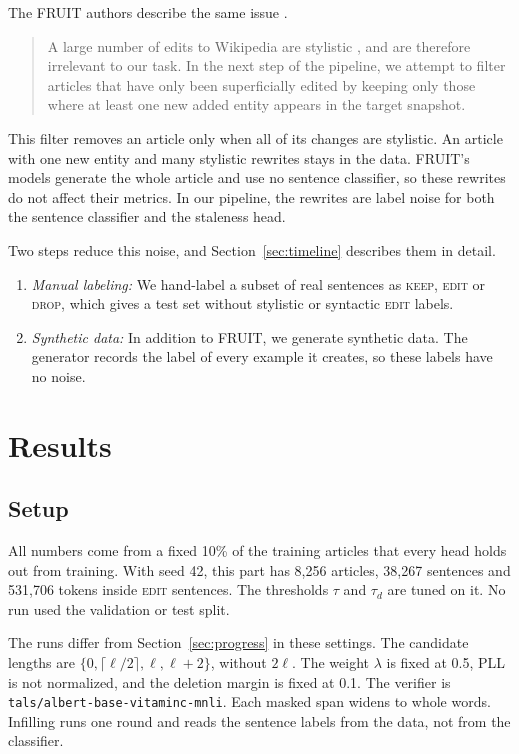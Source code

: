 \documentclass[11pt]{article}
\newcommand{\keep}{\textsc{keep}}
\newcommand{\edit}{\textsc{edit}}
\newcommand{\drop}{\textsc{drop}}
\begin{document}
    The FRUIT authors describe the same issue \citep{iv-etal-2022-fruit}.
    \begin{quote}
    A large number of edits to Wikipedia are stylistic \citep{daxenberger-gurevych-2012-corpus}, and are therefore irrelevant to our task. In the next step of the pipeline, we attempt to filter articles that have only been superficially edited by keeping only those where at least one new added entity appears in the target snapshot.
    \end{quote}

    This filter removes an article only when all of its changes are stylistic. An article with one new entity and many stylistic rewrites stays in the data. FRUIT's models generate the whole article and use no sentence classifier, so these rewrites do not affect their metrics. In our pipeline, the rewrites are label noise for both the sentence classifier and the staleness head.

    Two steps reduce this noise, and Section~\ref{sec:timeline} describes them in detail.
    \begin{enumerate}
        \item \emph{Manual labeling:} We hand-label a subset of real sentences as \keep{}, \edit{} or \drop{}, which gives a test set without stylistic or syntactic \edit{} labels.
        \item \emph{Synthetic data:} In addition to FRUIT, we generate synthetic data. The generator records the label of every example it creates, so these labels have no noise.
    \end{enumerate}

\section{Results}
\label{sec:results}

\subsection{Setup}
\label{subsec:setup}
    All numbers come from a fixed 10\% of the training articles that every head holds out from training. With seed 42, this part has 8,256 articles, 38,267 sentences and 531,706 tokens inside \edit{} sentences. The thresholds $\tau$ and $\tau_d$ are tuned on it. No run used the validation or test split.

    The runs differ from Section~\ref{sec:progress} in these settings. The candidate lengths are $\{0, \lceil \ell/2 \rceil, \ell, \ell+2\}$, without $2\ell$. The weight $\lambda$ is fixed at 0.5, PLL is not normalized, and the deletion margin is fixed at 0.1. The verifier is \texttt{tals/albert-base-vitaminc-mnli}. Each masked span widens to whole words. Infilling runs one round and reads the sentence labels from the data, not from the classifier.
\end{document}
